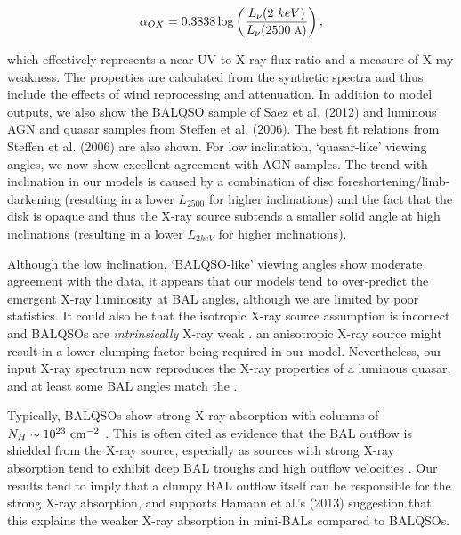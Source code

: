 \documentclass[preprint, a4paper, 11pt]{aastex}
\begin{document}
\begin{equation}
\alpha_{OX}=0.3838\log\left(\frac{L_{\nu}(2~keV)}{L_{\nu}(2500~\mbox{\scriptsize{\AA}})}\right),
\end{equation}

which effectively represents a near-UV to X-ray flux ratio and a measure of X-ray 
weakness. The properties are calculated from the synthetic spectra and thus include
the effects of wind reprocessing and attenuation. In addition to model outputs,
we also show the BALQSO sample of Saez et al. (2012) and luminous AGN and quasar
samples from Steffen et al. (2006). The best fit relations from Steffen et al. (2006)
are also shown.
For low inclination, `quasar-like' viewing angles,
we now show excellent agreement with AGN samples. The trend with inclination
in our models is caused by a combination of disc foreshortening/limb-darkening 
(resulting in a lower $L_{2500}$ for higher inclinations) and the fact that the disk 
is opaque and thus the X-ray source subtends a smaller solid angle at high inclinations
(resulting in a lower $L_{2keV}$ for higher inclinations). 

Although the low inclination, `BALQSO-like' viewing angles show moderate agreement with the data,
it appears that our models tend to over-predict the emergent X-ray luminosity at BAL angles, 
although we are limited by poor statistics. 
It could also be that the isotropic X-ray source assumption 
is incorrect and BALQSOs are {\em intrinsically} 
X-ray weak \citep[e.g.][]{morabito2013}. 
an anisotropic X-ray source might result in a lower clumping factor being
required in our model.
Nevertheless, our input X-ray spectrum
now reproduces the X-ray properties of a luminous quasar,
and at least some BAL angles match the .

Typically, BALQSOs show strong X-ray absorption with columns 
of $N_H\sim10^{23}~\rm{cm^{-2}}$ 
\citep{green1996,mathur2000,green2001,grupemathur2003}.
This is often cited as evidence that the BAL outflow is shielded from
the X-ray source, especially as sources with strong X-ray absorption tend
to exhibit deep BAL troughs and high outflow velocities 
\citep{brandt2000,laorbrandt2002,gallagher2006}.
Our results tend to imply that a clumpy BAL outflow
itself can be responsible for the strong X-ray absorption, 
and supports Hamann et al.'s (2013) suggestion that 
this explains the weaker X-ray absorption in mini-BALs 
compared to BALQSOs.
\end{document}
